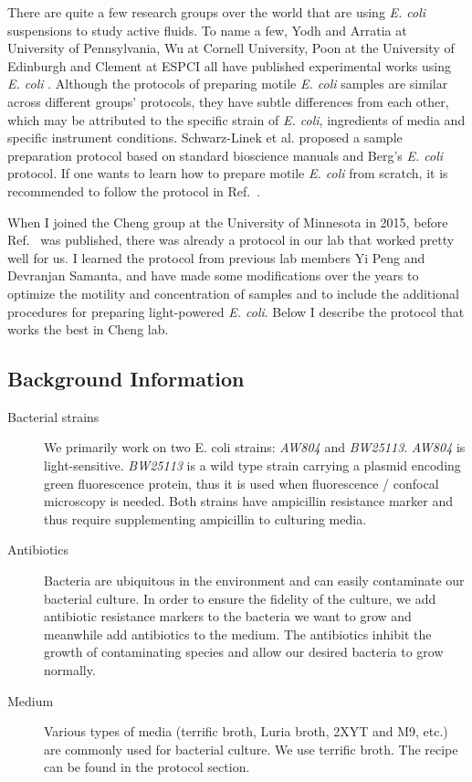 There are quite a few research groups over the world that are using \textit{E. coli} suspensions to study active fluids. To name a few, Yodh and Arratia at University of Pennsylvania, Wu at Cornell University, Poon at the University of Edinburgh and Clement at ESPCI all have published experimental works using \textit{E. coli} \cite{Chen2007, Patteson2016, Kasyap2014, Jepson2013, Mino2011}. Although the protocols of preparing motile \textit{E. coli} samples are similar across different groups' protocols, they have subtle differences from each other, which may be attributed to the specific strain of \textit{E. coli}, ingredients of media and specific instrument conditions. Schwarz-Linek et al. proposed a sample preparation protocol based on standard bioscience manuals \cite{Bonner2011}
and Berg's \textit{E. coli} protocol. If one wants to learn how to prepare motile \textit{E. coli} from scratch, it is recommended to follow the protocol in Ref.~\cite{Schwarz-Linek2016}.

When I joined the Cheng group at the University of Minnesota in 2015, before Ref.~\cite{Schwarz-Linek2016} was published, there was already a protocol in our lab that worked pretty well for us. I learned the protocol from previous lab members Yi Peng and Devranjan Samanta, and have made some modifications over the years  to optimize the motility and concentration of samples and to include the additional procedures for preparing light-powered \textit{E. coli}. Below I describe the protocol that works the best in Cheng lab.

\subsection{Background Information}
\begin{description}
  \item [Bacterial strains] We primarily work on two E. coli strains: \textit{AW804} and \textit{BW25113}. \textit{AW804} is light-sensitive. \textit{BW25113} is a wild type strain carrying a plasmid encoding green fluorescence protein, thus it is used when fluorescence / confocal microscopy is needed. Both strains have ampicillin resistance marker and thus require supplementing ampicillin to culturing media.
  \item [Antibiotics] Bacteria are ubiquitous in the environment and can easily  contaminate our bacterial culture. In order to ensure the fidelity of the culture, we add antibiotic resistance markers to the bacteria we want to grow and meanwhile add antibiotics to the medium. The antibiotics inhibit the growth of contaminating species and allow our desired bacteria to grow normally.
  \item [Medium] Various types of media (terrific broth, Luria broth, 2XYT and M9, etc.) are commonly used for bacterial culture. We use terrific broth. The recipe can be found in the protocol section.
\end{description}

